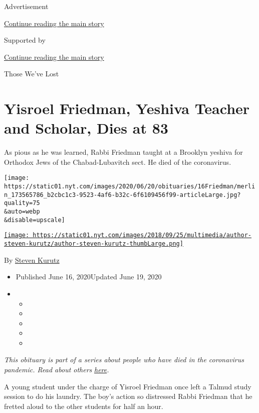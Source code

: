 Advertisement

\protect\hyperlink{after-top}{Continue reading the main story}

Supported by

\protect\hyperlink{after-sponsor}{Continue reading the main story}

Those We've Lost

\hypertarget{yisroel-friedman-yeshiva-teacher-and-scholar-dies-at-83}{%
\section{Yisroel Friedman, Yeshiva Teacher and Scholar, Dies at
83}\label{yisroel-friedman-yeshiva-teacher-and-scholar-dies-at-83}}

As pious as he was learned, Rabbi Friedman taught at a Brooklyn yeshiva
for Orthodox Jews of the Chabad-Lubavitch sect. He died of the
coronavirus.

\texttt{[image: https://static01.nyt.com/images/2020/06/20/obituaries/16Friedman/merlin\_173565786\_b2cbc1c3-9523-4af6-b32c-6f6109456f99-articleLarge.jpg?quality=75\\\&auto=webp\\\&disable=upscale]}

\href{https://www.nytimes.com/by/steven-kurutz}{\texttt{[image: https://static01.nyt.com/images/2018/09/25/multimedia/author-steven-kurutz/author-steven-kurutz-thumbLarge.png]}}

By \href{https://www.nytimes.com/by/steven-kurutz}{Steven Kurutz}

\begin{itemize}
\item
  Published June 16, 2020Updated June 19, 2020
\item
  \begin{itemize}
  \item
  \item
  \item
  \item
  \item
  \end{itemize}
\end{itemize}

\emph{This obituary is part of a series about people who have died in
the coronavirus pandemic. Read about others}
\href{https://www.nytimes.com/interactive/2020/obituaries/people-died-coronavirus-obituaries.html}{\emph{here}}\emph{.}

A young student under the charge of Yisroel Friedman once left a Talmud
study session to do his laundry. The boy's action so distressed Rabbi
Friedman that he fretted aloud to the other students for half an hour.

